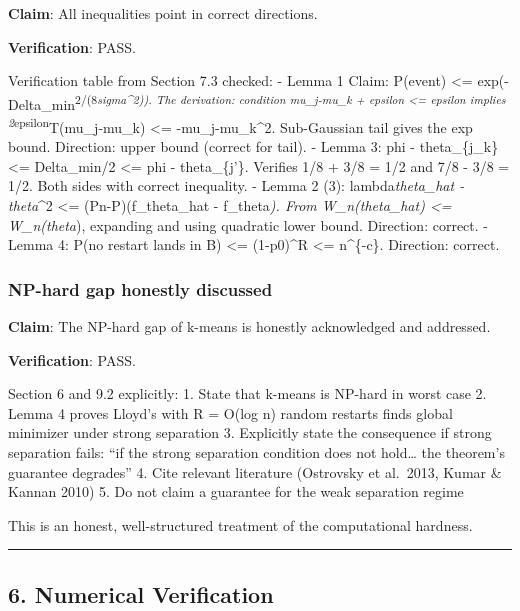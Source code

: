 \documentclass[
  12pt,
]{article}
\begin{document}
\textbf{Claim}: All inequalities point in correct directions.

\textbf{Verification}: PASS.

Verification table from Section 7.3 checked: - Lemma 1 Claim: P(event)
\textless= exp(-Delta\_min\textsuperscript{2/(8\emph{sigma\^{}2)). The
derivation: condition \textbar\textbar mu\_j-mu\_k +
epsilon\textbar\textbar{} \textless=
\textbar\textbar epsilon\textbar\textbar{} implies
2}epsilon}T(mu\_j-mu\_k) \textless=
-\textbar\textbar mu\_j-mu\_k\textbar\textbar\^{}2. Sub-Gaussian tail
gives the exp bound. Direction: upper bound (correct for tail). - Lemma
3: \textbar\textbar phi - theta\_\{j\_k\}\textbar\textbar{} \textless=
Delta\_min/2 \textless= \textbar\textbar phi -
theta\_\{j'\}\textbar\textbar. Verifies 1/8 + 3/8 = 1/2 and 7/8 - 3/8 =
1/2. Both sides with correct inequality. - Lemma 2 (3):
lambda\emph{\textbar\textbar theta\_hat - theta}\textbar\textbar\^{}2
\textless= \textbar(Pn-P)(f\_theta\_hat - f\_theta\emph{)\textbar. From
W\_n(theta\_hat) \textless= W\_n(theta}), expanding and using quadratic
lower bound. Direction: correct. - Lemma 4: P(no restart lands in B)
\textless= (1-p0)\^{}R \textless= n\^{}\{-c\}. Direction: correct.

\subsubsection{NP-hard gap honestly
discussed}\label{np-hard-gap-honestly-discussed}

\textbf{Claim}: The NP-hard gap of k-means is honestly acknowledged and
addressed.

\textbf{Verification}: PASS.

Section 6 and 9.2 explicitly: 1. State that k-means is NP-hard in worst
case 2. Lemma 4 proves Lloyd's with R = O(log n) random restarts finds
global minimizer under strong separation 3. Explicitly state the
consequence if strong separation fails: ``if the strong separation
condition does not hold\ldots{} the theorem's guarantee degrades'' 4.
Cite relevant literature (Ostrovsky et al.~2013, Kumar \& Kannan 2010)
5. Do not claim a guarantee for the weak separation regime

This is an honest, well-structured treatment of the computational
hardness.

\begin{center}\rule{0.5\linewidth}{0.5pt}\end{center}

\subsection{6. Numerical Verification}\label{numerical-verification}
\end{document}
